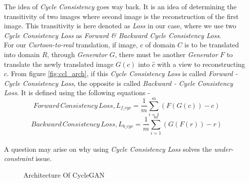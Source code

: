 The idea of \textit{Cycle Consistency} goes way back. It is an idea of determining the transitivity of two images where second image is the reconstruction of the first image. This transitivity is here denoted as \textit{Loss} in our case, where we use two \textit{Cycle Consistency Loss} as \textit{Forward \& Backward Cycle Consistency Loss}.\\
For our \textit{Cartoon-to-real} translation, if image, $c$ of domain $C$ is to be translated into domain $R$, through \textit{Generator} $G$, there must be another \textit{Generator} $F$ to translate the newly translated image $G(c)$ into $\hat{c}$ with a view to reconstructing $c$. From figure \ref{fig:ccl_arch}, if this \textit{Cycle Consistency Loss} is called \textit{Forward - Cycle Consistency Loss}, the opposite is called \textit{Backward - Cycle Consistency Loss}. It is defined using the following equations -
$$Forward\, Consistency\, Loss, L_{f\_cyc} = \frac{1}{m} \sum^m_{i=1}(F(G(c)) - c) $$
$$Backward\, Consistency\, Loss, L_{b\_cyc} = \frac{1}{m} \sum^m_{i=1}(G(F(r)) - r) $$
\\
A question may arise on why using \textit{Cycle Consistency Loss} solves the \textit{under-constraint} issue. 
\begin{figure}[!ht] 
 \begin{center}
\caption{Architecture Of CycleGAN}
\end{center} 
\label{fig:example}
\end{figure}
